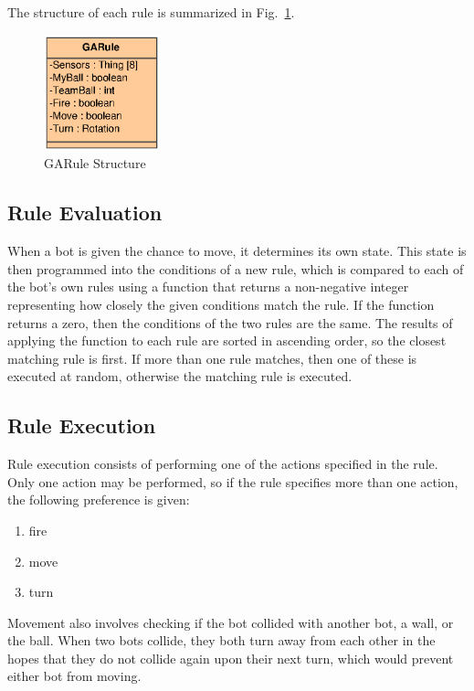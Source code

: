 \documentclass[%
        compressed,
        notitlepage,
        narroweqnarray,
        inline,
        ]{ieee}
\begin{document}
The structure of each rule is summarized in Fig.~\ref{fig:rule}.

\begin{figure}[htp]
\centering
\includegraphics[width=0.3\textwidth]{rule.eps}
\caption[GARule]{GARule Structure}
\label{fig:rule}
\end{figure}

\subsection{Rule Evaluation}

When a bot is given the chance to move, it determines its own state. This
state is then programmed into the conditions of a new rule, which is
compared to each of the bot's own rules using a function that returns a
non-negative integer representing how closely the given conditions match the
rule. If the function returns a zero, then the conditions of the two
rules are the same. The results of applying the function to each rule are sorted
in ascending order, so the closest matching rule is first. If more than one
rule matches, then one of these is executed at random, otherwise the matching
rule is executed.

\subsection{Rule Execution}

Rule execution consists of performing one of the actions specified
in the rule. Only one action may be performed, so if the rule specifies
more than one action, the following preference is given:\nopagebreak
\begin{enumerate}
\item fire 
\item move 
\item turn 
\end{enumerate}

Movement also involves checking if the bot collided with another bot,
a wall, or the ball. When two bots collide, they both turn away from
each other in the hopes that they do not collide again upon their next
turn, which would prevent either bot from moving.
\end{document}
